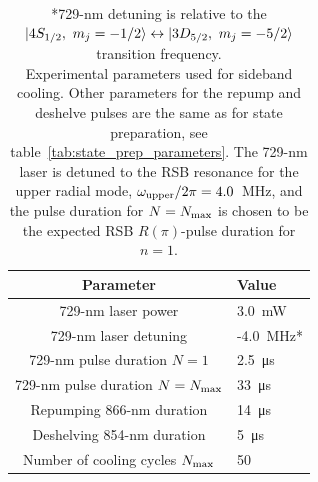    \begin{table}
        \begin{center}
        \begin{tabular}{|c|l|}
            \hline
            Parameter & Value \\
            \hline
            729-nm laser power & 3.0~\unit{\mW}\\
            729-nm laser detuning & -4.0~\unit{\MHz}*\\
            729-nm pulse duration $N = 1$ & 2.5~\unit{\us}\\
            729-nm pulse duration $N = N_{\rm max}$ & 33~\unit{\us}  \\
            Repumping 866-nm duration & 14~\unit{\us}\\
            Deshelving 854-nm duration & 5~\unit{\us}\\
            Number of cooling cycles $N_{\rm max}$ & 50\\
            \hline
        \end{tabular}
        \end{center}
        \caption{
            *729-nm detuning is relative to the $\ket{4S_{1/2},~m_j=-1/2} \leftrightarrow \ket{3D_{5/2},~m_j=-5/2}$ transition frequency.\\
            Experimental parameters used for sideband cooling. Other parameters for the repump and deshelve pulses are the same as for state preparation, see table~\ref{tab:state_prep_parameters}. The 729-nm laser is detuned to the RSB resonance for the upper radial mode, $\omega_{\rm upper}/2\pi = 4.0$~\unit{\MHz}, and the pulse duration for $N=N_{\rm max}$ is chosen to be the expected RSB $R(\pi)$-pulse duration for $n=1$. 
            }
        \label{tab:sbc_parameters}
    \end{table}


